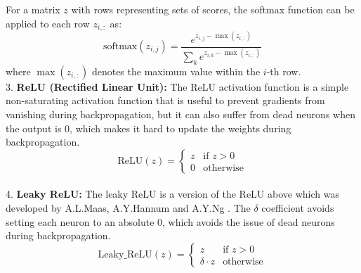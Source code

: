 For a matrix \( z \) with rows representing sets of scores, the softmax function can be applied to each row \( z_{i,:} \) as:
\[
\text{softmax}(z_{i,j}) = \frac{e^{z_{i,j} - \max(z_{i,:})}}{\sum_{k} e^{z_{i,k} - \max(z_{i,:})}}
\]
where \( \max(z_{i,:}) \) denotes the maximum value within the \( i \)-th row.
\\
3. \textbf{ReLU (Rectified Linear Unit):}
The ReLU activation function is a simple non-saturating activation function that is useful to prevent gradients from vanishing during backpropagation, 
but it can also suffer from dead neurons when the output is 0, which makes it hard to update the weights during backpropagation.  
\[
\text{ReLU}(z) = 
\begin{cases} 
   z & \text{if } z > 0 \\
   0 & \text{otherwise}
\end{cases}
\]
\\
4. \textbf{Leaky ReLU:}
The leaky ReLU is a version of the ReLU above which was developed by A.L.Maas, A.Y.Hannum and A.Y.Ng \cite{relu_best_ever}. The $\delta$ coefficient avoids
setting each neuron to an absolute 0, which avoids the issue of dead neurons during backpropagation.
\[
\text{Leaky\_ReLU}(z) = 
\begin{cases} 
   z & \text{if } z > 0 \\
   \delta \cdot z & \text{otherwise}
\end{cases}
\]


